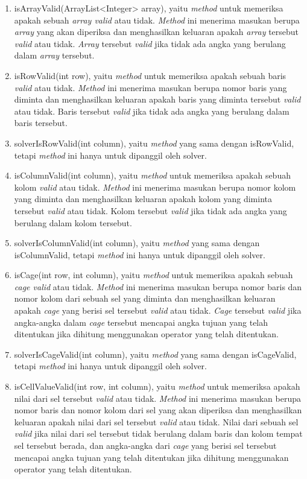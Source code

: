 \begin{enumerate}
\item isArrayValid(ArrayList<Integer> array), yaitu \textit{method} untuk memeriksa apakah sebuah \textit{array valid} atau tidak. \textit{Method} ini menerima masukan berupa \textit{array} yang akan diperiksa dan menghasilkan keluaran apakah \textit{array} tersebut \textit{valid} atau tidak. \textit{Array} tersebut \textit{valid} jika tidak ada angka yang berulang dalam \textit{array} tersebut.
\item isRowValid(int row), yaitu \textit{method} untuk memeriksa apakah sebuah baris \textit{valid} atau tidak. \textit{Method} ini menerima masukan berupa nomor baris yang diminta dan menghasilkan keluaran apakah baris yang diminta tersebut \textit{valid} atau tidak. Baris tersebut \textit{valid} jika tidak ada angka yang berulang dalam baris tersebut.
\item solverIsRowValid(int column), yaitu \textit{method} yang sama dengan isRowValid, tetapi \textit{method} ini hanya untuk dipanggil oleh solver.
\item isColumnValid(int column), yaitu \textit{method} untuk memeriksa apakah sebuah kolom \textit{valid} atau tidak. \textit{Method} ini menerima masukan berupa nomor kolom yang diminta dan menghasilkan keluaran apakah kolom yang diminta tersebut \textit{valid} atau tidak. Kolom tersebut \textit{valid} jika tidak ada angka yang berulang dalam kolom tersebut.
\item solverIsColumnValid(int column), yaitu \textit{method} yang sama dengan isColumnValid, tetapi \textit{method} ini hanya untuk dipanggil oleh solver.
\item isCage(int row, int column), yaitu \textit{method} untuk memeriksa apakah sebuah \textit{cage valid} atau tidak. \textit{Method} ini menerima masukan berupa nomor baris dan nomor kolom dari sebuah sel yang diminta dan menghasilkan keluaran apakah \textit{cage} yang berisi sel tersebut \textit{valid} atau tidak. \textit{Cage} tersebut \textit{valid} jika angka-angka dalam \textit{cage} tersebut mencapai angka tujuan yang telah ditentukan jika dihitung menggunakan operator yang telah ditentukan.
\item solverIsCageValid(int column), yaitu \textit{method} yang sama dengan isCageValid, tetapi \textit{method} ini hanya untuk dipanggil oleh solver.
\item isCellValueValid(int row, int column), yaitu \textit{method} untuk memeriksa apakah nilai dari sel tersebut \textit{valid} atau tidak. \textit{Method} ini menerima masukan berupa nomor baris dan nomor kolom dari sel yang akan diperiksa dan menghasilkan keluaran apakah nilai dari sel tersebut \textit{valid} atau tidak. Nilai dari sebuah sel \textit{valid} jika nilai dari sel tersebut tidak berulang dalam baris dan kolom tempat sel tersebut berada, dan angka-angka dari \textit{cage} yang berisi sel tersebut mencapai angka tujuan yang telah ditentukan jika dihitung menggunakan operator yang telah ditentukan.

\end{enumerate}
